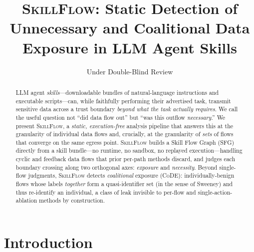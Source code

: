 \documentclass[sigconf,anonymous,review]{acmart}
\newcommand{\sys}{\textsc{SkillFlow}\xspace}
\newcommand{\sfg}{\textsc{SFG}\xspace}      %
\newcommand{\code}{\textsc{CoDE}\xspace}     %
\newcommand{\qi}{quasi-identifier\xspace}
\begin{document}
\title{\sys: Static Detection of Unnecessary and Coalitional Data Exposure in LLM Agent Skills}

\author{Under Double-Blind Review}
\affiliation{\institution{}\country{}}

\begin{abstract}
LLM agent \emph{skills}---downloadable bundles of natural-language instructions and
executable scripts---can, while faithfully performing their advertised task, transmit
sensitive data across a trust boundary \emph{beyond what the task actually requires}.
We call the useful question not ``did data flow out'' but ``was this outflow
\emph{necessary}.'' We present \sys, a \emph{static, execution-free} analysis pipeline that
answers this at the granularity of individual data flows and, crucially, at the
granularity of \emph{sets} of flows that converge on the same egress point. \sys{}
builds a Skill Flow Graph (\sfg) directly from a skill bundle---no runtime, no sandbox,
no replayed execution---handling cyclic and feedback data flows that prior per-path
methods discard, and judges each boundary crossing along two orthogonal axes:
\emph{exposure} and \emph{necessity}. Beyond single-flow judgments, \sys{} detects
\emph{coalitional} exposure (\code): individually-benign flows whose labels
\emph{together} form a \qi{} set (in the sense of Sweeney) and thus re-identify an
individual, a class of leak invisible to per-flow and single-action-ablation methods
by construction. %
\end{abstract}

\maketitle

\section{Introduction}\label{sec:intro}
\end{document}
